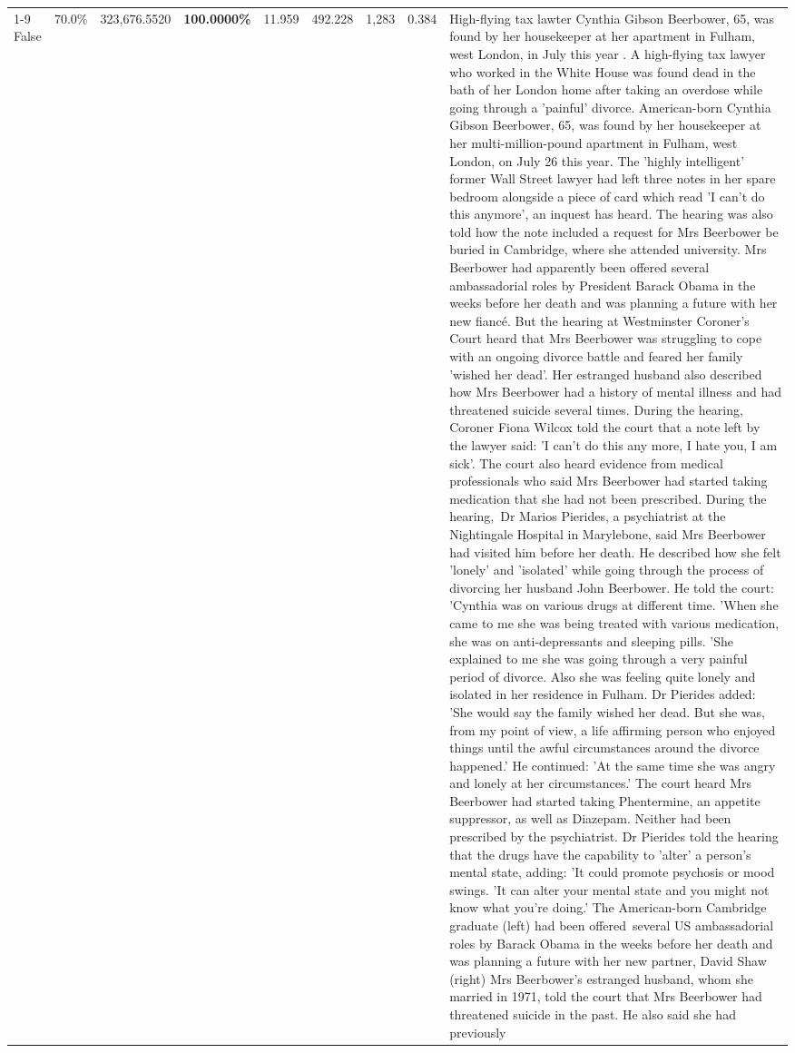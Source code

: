 \begin{table}[H]
\begin{tabular}{lllrlllll}
\cline{1-9}
False & 70.0\% & 323,676.5520 & \bfseries \color{red} 100.0000\% & 11.959 & 492.228 & 1,283 & 0.384 & High-flying tax lawter Cynthia Gibson Beerbower, 65, was found by her housekeeper at her apartment in Fulham, west London, in July this year . A high-flying tax lawyer who worked in the White House was found dead in the bath of her London home after taking an overdose while going through a 'painful' divorce. American-born Cynthia Gibson Beerbower, 65, was found by her housekeeper at her multi-million-pound apartment in Fulham, west London, on July 26 this year. The 'highly intelligent' former Wall Street lawyer had left three notes in her spare bedroom alongside a piece of card which read 'I can't do this anymore', an inquest has heard. The hearing was also told how the note included a request for Mrs Beerbower be buried in Cambridge, where she attended university. Mrs Beerbower had apparently been offered several ambassadorial roles by President Barack Obama in the weeks before her death and was planning a future with her new fiancé. But the hearing at Westminster Coroner's Court heard that Mrs Beerbower was struggling to cope with an ongoing divorce battle and feared her family 'wished her dead'. Her estranged husband also described how Mrs Beerbower had a history of mental illness and had threatened suicide several times. During the hearing, Coroner Fiona Wilcox told the court that a note left by the lawyer said: 'I can't do this any more, I hate you, I am sick'. The court also heard evidence from medical professionals who said Mrs Beerbower had started taking medication that she had not been prescribed. During the hearing, Dr Marios Pierides, a psychiatrist at the Nightingale Hospital in Marylebone, said Mrs Beerbower had visited him before her death. He described how she felt 'lonely' and 'isolated' while going through the process of divorcing her husband John Beerbower. He told the court: 'Cynthia was on various drugs at different time. 'When she came to me she was being treated with various medication, she was on anti-depressants and sleeping pills. 'She explained to me she was going through a very painful period of divorce. Also she was feeling quite lonely and isolated in her residence in Fulham. Dr Pierides added: 'She would say the family wished her dead. But she was, from my point of view, a life affirming person who enjoyed things until the awful circumstances around the divorce happened.' He continued: 'At the same time she was angry and lonely at her circumstances.' The court heard Mrs Beerbower had started taking Phentermine, an appetite suppressor, as well as Diazepam. Neither had been prescribed by the psychiatrist. Dr Pierides told the hearing that the drugs have the capability to 'alter' a person's mental state, adding: 'It could promote psychosis or mood swings. 'It can alter your mental state and you might not know what you're doing.' The American-born Cambridge graduate (left) had been offered several US ambassadorial roles by Barack Obama in the weeks before her death and was planning a future with her new partner, David Shaw (right) Mrs Beerbower's estranged husband, whom she married in 1971, told the court that Mrs Beerbower had threatened suicide in the past. He also said she had previously 
\end{tabular}
\end{table}
